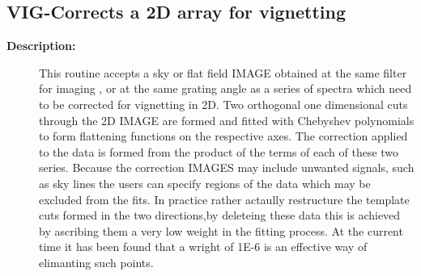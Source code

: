 \subsection{VIG-\label{VIG}Corrects a 2D array for vignetting}
\begin{description}

\item [\textbf{Description:}]
   This routine accepts a sky or flat field IMAGE obtained at
   the same filter for imaging , or at the same grating angle as a
   series of spectra which need to be corrected for vignetting
   in 2D.
   Two orthogonal one dimensional cuts through the 2D
   IMAGE are formed and fitted with Chebyshev polynomials to form
   flattening functions on the respective axes. The correction
   applied to the data is formed from the product of the terms of
   each of these two series.
   Because the correction IMAGES may include unwanted signals, such as
   sky lines the users can specify regions of the data which may
   be excluded from the fits. In practice rather actaully restructure
   the template cuts formed in the two directions,by deleteing these
   data this is achieved by ascribing them a very low weight in
   the fitting process. At the current time it has been found that a
   wright of 1E-6 is an effective way of elimanting such points.


\end{description}
